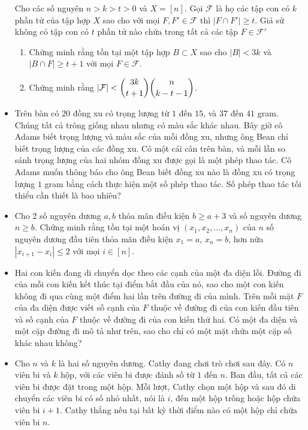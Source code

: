\documentclass[11pt]{scrartcl}
\begin{document}
\begin{itemize}[label=, leftmargin=0em, itemsep=-0em]
\begin{btvn}
        Cho các số nguyên $n > k > t > 0$ và $X = [n]$. Gọi $\mathcal{F}$ là họ các tập con có $k$ phần tử của tập hợp $X$ sao cho với mọi $F,F' \in \mathcal{F}$ thì $|F \cap F'| \geq t$. Giả sử không có tập con có $t$ phần tử nào chứa trong tất cả các tập $F \in \mathcal{F}'$
        \begin{enumerate}[label=(\alph*)]
            \item Chứng minh rằng tồn tại một tập hợp $B \subset X$ sao cho $|B| < 3k$ và $|B \cap F| \geq t + 1$ với mọi $F \in \mathcal{F}$.
            \item Chứng minh rằng $|\mathcal{F}| < \displaystyle\binom{3k}{t + 1}\displaystyle\binom{n}{k - t - 1}$.
        \end{enumerate}
    \end{btvn}

    \item \begin{btvn}
        Trên bàn có $20$ đồng xu có trọng lượng từ $1$ đến $15$, và $37$ đến $41$ gram. Chúng tất cả trông giống nhau nhưng có màu sắc khác nhau. Bây giờ cô Adams biết trọng lượng và màu sắc của mỗi đồng xu, nhưng ông Bean chỉ biết trọng lượng của các đồng xu. Có một cái cân trên bàn, và mỗi lần so sánh trọng lượng của hai nhóm đồng xu được gọi là một phép thao tác. Cô Adams muốn thông báo cho ông Bean biết đồng xu nào là đồng xu có trọng lượng $1$ gram bằng cách thực hiện một số phép thao tác. Số phép thao tác tối thiểu cần thiết là bao nhiêu?
    \end{btvn}
    \item \begin{btvn} Cho 2 số nguyên dương $a,b$ thỏa mãn điều kiện $b \geq a + 3$ và số nguyên dương $n \geq b$. Chứng minh rằng tồn tại một hoán vị $(x_1,x_2,\dots,x_n)$ của $n$ số nguyên dương đầu tiên thỏa mãn điều kiện $x_1 = a$, $x_n = b$, hơn nữa $|x_{i + 1} - x_{i}| \leq 2$ với mọi $i \in [n]$.
    \end{btvn}
    \item \begin{btvn}
        Hai con kiến đang di chuyển dọc theo các cạnh của một đa diện lồi. Đường đi của mỗi con kiến kết thúc tại điểm bắt đầu của nó, sao cho một con kiến không đi qua cùng một điểm hai lần trên đường đi của mình. Trên mỗi mặt $F$ của đa diện được viết số cạnh của $F$ thuộc về đường đi của con kiến đầu tiên và số cạnh của $F$ thuộc về đường đi của con kiến thứ hai. Có một đa diện và một cặp đường đi mô tả như trên, sao cho chỉ có một mặt chứa một cặp số khác nhau không?
    \end{btvn}
    \item \begin{btvn}
        Cho \( n \) và \( k \) là hai số nguyên dương. Cathy đang chơi trò chơi sau đây. Có \( n \) viên bi và \( k \) hộp, với các viên bi được đánh số từ \( 1 \) đến \( n \). Ban đầu, tất cả các viên bi được đặt trong một hộp. Mỗi lượt, Cathy chọn một hộp và sau đó di chuyển các viên bi có số nhỏ nhất, nói là \( i \), đến một hộp trống hoặc hộp chứa viên bi \( i+1 \). Cathy thắng nếu tại bất kỳ thời điểm nào có một hộp chỉ chứa viên bi \( n \).


\end{btvn}
\end{itemize}
\end{document}

